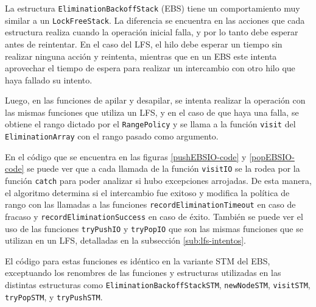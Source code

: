 La estructura \texttt{EliminationBackoffStack} (EBS) tiene un comportamiento muy similar a un \texttt{LockFreeStack}. La diferencia se encuentra en las acciones que cada estructura realiza cuando la operación inicial falla, y por lo tanto debe esperar antes de reintentar. En el caso del LFS, el hilo debe esperar un tiempo sin realizar ninguna acción y reintenta, mientras que en un EBS este intenta aprovechar el tiempo de espera para realizar un intercambio con otro hilo que haya fallado su intento.

Luego, en las funciones de apilar y desapilar, se intenta realizar la operación con las mismas funciones que utiliza un LFS, y en el caso de que haya una falla, se obtiene el rango dictado por el \texttt{RangePolicy} y se llama a la función \texttt{visit} del \texttt{EliminationArray} con el rango pasado como argumento.

En el código que se encuentra en las figuras \ref{pushEBSIO-code} y \ref{popEBSIO-code} se puede ver que a cada llamada de la función \texttt{visitIO} se la rodea por la función \texttt{catch} para poder analizar si hubo excepciones arrojadas. De esta manera, el algoritmo determina si el intercambio fue exitoso y modifica la política de rango con las llamadas a las funciones \texttt{recordEliminationTimeout} en caso de fracaso y \texttt{recordEliminationSuccess} en caso de éxito. También se puede ver el uso de las funciones \texttt{tryPushIO} y \texttt{tryPopIO} que son las mismas funciones que se utilizan en un LFS, detalladas en la subsección \ref{sub:lfs-intentos}.

El código para estas funciones es idéntico en la variante STM del EBS, exceptuando los renombres de las funciones y estructuras utilizadas en las distintas estructuras como \texttt{EliminationBackoffStackSTM}, \texttt{newNodeSTM}, \texttt{visitSTM}, \texttt{tryPopSTM}, y \texttt{tryPushSTM}.

